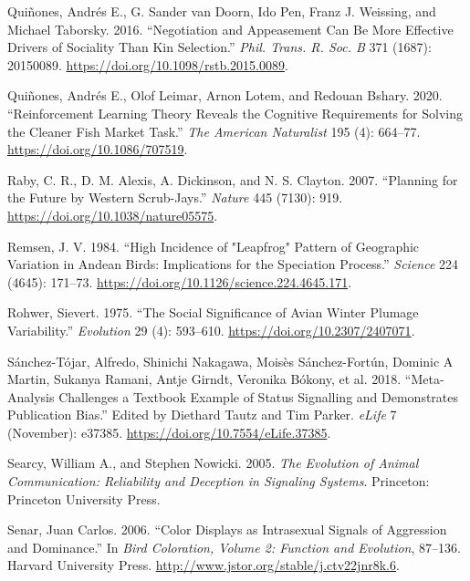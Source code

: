 \documentclass[
  12pt,
]{article}
\newlength{\cslhangindent}
\newlength{\cslentryspacingunit} %
\newenvironment{CSLReferences}[2] %
 {%
  \setlength{\parindent}{0pt}
  \ifodd #1
  \let\oldpar\par
  \def\par{\hangindent=\cslhangindent\oldpar}
  \fi
  \setlength{\parskip}{#2\cslentryspacingunit}
 }%
 {}
\begin{document}
\begin{CSLReferences}{1}{0}
\leavevmode{}%
Quiñones, Andrés E., G. Sander van Doorn, Ido Pen, Franz J. Weissing,
and Michael Taborsky. 2016. {``Negotiation and Appeasement Can Be More
Effective Drivers of Sociality Than Kin Selection.''} \emph{Phil. Trans.
R. Soc. B} 371 (1687): 20150089.
\url{https://doi.org/10.1098/rstb.2015.0089}.

\leavevmode{}%
Quiñones, Andrés E., Olof Leimar, Arnon Lotem, and Redouan Bshary. 2020.
{``Reinforcement {Learning} {Theory} {Reveals} the {Cognitive}
{Requirements} for {Solving} the {Cleaner} {Fish} {Market} {Task}.''}
\emph{The American Naturalist} 195 (4): 664--77.
\url{https://doi.org/10.1086/707519}.

\leavevmode{}%
Raby, C. R., D. M. Alexis, A. Dickinson, and N. S. Clayton. 2007.
{``Planning for the Future by Western Scrub-Jays.''} \emph{Nature} 445
(7130): 919. \url{https://doi.org/10.1038/nature05575}.

\leavevmode{}%
Remsen, J. V. 1984. {``High {Incidence} of "{Leapfrog}" {Pattern} of
{Geographic} {Variation} in {Andean} {Birds}: {Implications} for the
{Speciation} {Process}.''} \emph{Science} 224 (4645): 171--73.
\url{https://doi.org/10.1126/science.224.4645.171}.

\leavevmode{}%
Rohwer, Sievert. 1975. {``The {Social} {Significance} of {Avian}
{Winter} {Plumage} {Variability}.''} \emph{Evolution} 29 (4): 593--610.
\url{https://doi.org/10.2307/2407071}.

\leavevmode{}%
Sánchez-Tójar, Alfredo, Shinichi Nakagawa, Moisès Sánchez-Fortún,
Dominic A Martin, Sukanya Ramani, Antje Girndt, Veronika Bókony, et al.
2018. {``Meta-Analysis Challenges a Textbook Example of Status
Signalling and Demonstrates Publication Bias.''} Edited by Diethard
Tautz and Tim Parker. \emph{eLife} 7 (November): e37385.
\url{https://doi.org/10.7554/eLife.37385}.

\leavevmode{}%
Searcy, William A., and Stephen Nowicki. 2005. \emph{The {Evolution} of
{Animal} {Communication}: {Reliability} and {Deception} in {Signaling}
{Systems}}. Princeton: Princeton University Press.

\leavevmode{}%
Senar, Juan Carlos. 2006. {``Color Displays as Intrasexual Signals of
Aggression and Dominance.''} In \emph{Bird Coloration, Volume 2:
{Function} and Evolution}, 87--136. Harvard University Press.
\url{http://www.jstor.org/stable/j.ctv22jnr8k.6}.


\end{CSLReferences}
\end{document}
